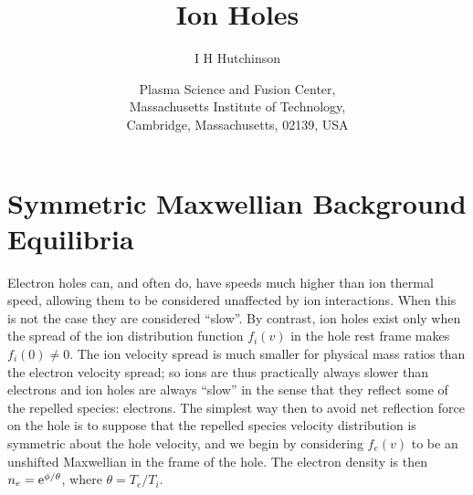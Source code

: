 \documentclass[12pt]{article}  %
\def\affiliation#1{\date{\normalsize #1}}
\def\etothe#1{{\rm e}^{#1}}
\begin{document}
\title{Ion Holes}
\author{I H Hutchinson}
\affiliation{Plasma Science and Fusion Center,\\ Massachusetts Institute of
  Technology,\\ Cambridge, Massachusetts, 02139, USA}

\ifx\altaffiliation\undefined\maketitle\fi %
\begin{abstract}
\end{abstract}
\ifx\altaffiliation\undefined\else\maketitle\fi  %

\section{Symmetric Maxwellian Background Equilibria}

Electron holes can, and often do, have speeds much higher than ion
thermal speed, allowing them to be considered unaffected by ion
interactions. When this is not the case they are considered ``slow''.
By contrast, ion holes exist only when the spread of the ion distribution
function $f_i(v)$ in the hole rest frame makes $f_i(0)\not=0$. The ion
velocity spread is much smaller for physical mass ratios than the
electron velocity spread; so ions are thus practically always slower than
electrons and ion holes are always ``slow'' in the sense that they reflect
some of the repelled species: electrons. The simplest way then to avoid net
reflection force on the hole is to suppose that the repelled species
velocity distribution is symmetric about the hole velocity, and we
begin by considering $f_e(v)$ to be an unshifted Maxwellian in the
frame of the hole. The electron density is then
$n_e=\etothe{\phi/\theta}$, where $\theta=T_e/T_i$.
\end{document}

